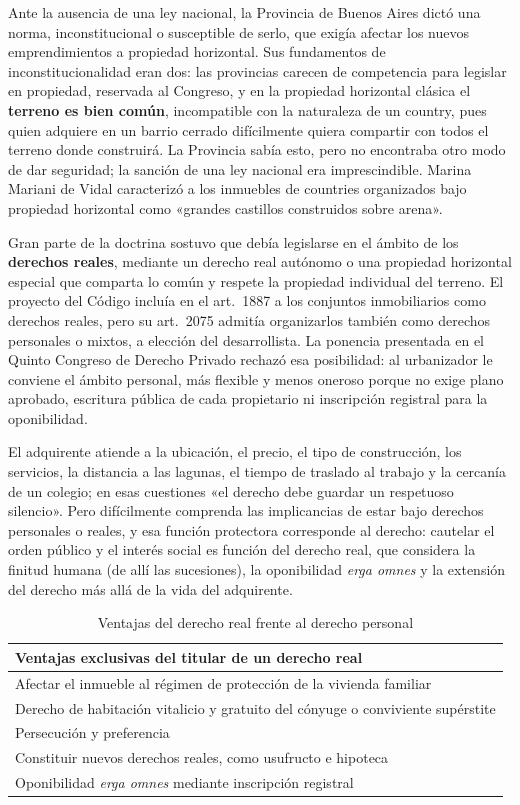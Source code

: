 \documentclass[12pt,oneside]{book}
\begin{document}
Ante la ausencia de una ley nacional, la Provincia de Buenos Aires dictó una norma, inconstitucional o susceptible de serlo, que exigía afectar los nuevos emprendimientos a propiedad horizontal. Sus fundamentos de inconstitucionalidad eran dos: las provincias carecen de competencia para legislar en propiedad, reservada al Congreso, y en la propiedad horizontal clásica el \textbf{terreno es bien común}, incompatible con la naturaleza de un country, pues quien adquiere en un barrio cerrado difícilmente quiera compartir con todos el terreno donde construirá. La Provincia sabía esto, pero no encontraba otro modo de dar seguridad; la sanción de una ley nacional era imprescindible. Marina Mariani de Vidal caracterizó a los inmuebles de countries organizados bajo propiedad horizontal como «grandes castillos construidos sobre arena».

Gran parte de la doctrina sostuvo que debía legislarse en el ámbito de los \textbf{derechos reales}, mediante un derecho real autónomo o una propiedad horizontal especial que comparta lo común y respete la propiedad individual del terreno. El proyecto del Código incluía en el art.~1887 a los conjuntos inmobiliarios como derechos reales, pero su art.~2075 admitía organizarlos también como derechos personales o mixtos, a elección del desarrollista. La ponencia presentada en el Quinto Congreso de Derecho Privado rechazó esa posibilidad: al urbanizador le conviene el ámbito personal, más flexible y menos oneroso porque no exige plano aprobado, escritura pública de cada propietario ni inscripción registral para la oponibilidad.

El adquirente atiende a la ubicación, el precio, el tipo de construcción, los servicios, la distancia a las lagunas, el tiempo de traslado al trabajo y la cercanía de un colegio; en esas cuestiones «el derecho debe guardar un respetuoso silencio». Pero difícilmente comprenda las implicancias de estar bajo derechos personales o reales, y esa función protectora corresponde al derecho: cautelar el orden público y el interés social es función del derecho real, que considera la finitud humana (de allí las sucesiones), la oponibilidad \textit{erga omnes} y la extensión del derecho más allá de la vida del adquirente.

\begin{table}[H]
\centering
\small
\begin{tabularx}{\textwidth}{>{\raggedright\arraybackslash}X}
\toprule
\textbf{Ventajas exclusivas del titular de un derecho real} \\
\midrule
Afectar el inmueble al régimen de protección de la vivienda familiar \\
Derecho de habitación vitalicio y gratuito del cónyuge o conviviente supérstite \\
Persecución y preferencia \\
Constituir nuevos derechos reales, como usufructo e hipoteca \\
Oponibilidad \textit{erga omnes} mediante inscripción registral \\
\bottomrule
\end{tabularx}
\caption{Ventajas del derecho real frente al derecho personal}
\end{table}
\end{document}
